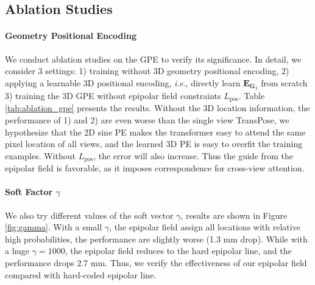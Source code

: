 \documentclass{bmvc2k}
\newcommand{\ie}{\textit{i}.\textit{e}., }
\begin{document}
\vspace{-0.5em}
\subsection{Ablation Studies}
\vspace{-0.5em}
\paragraph{Geometry Positional Encoding}
We conduct ablation studies on the GPE to verify its significance. In detail, we consider 3  settings: 1) training without 3D geometry positional encoding, 2) applying a learnable 3D positional encoding, \ie directly learn $\mathbf{E_G}_i$ from scratch 3) training the 3D GPE without epipolar field constraints $L_{\text{pos}}$. 
Table \ref{tab:ablation_gpe} presents the results. Without the 3D location information, the performance of 1) and 2) are even worse than the single view TransPose, we hypothesize that the 2D sine PE makes the transformer easy to attend the same pixel location of all views, and the learned 3D PE is easy to overfit the training examples. 
Without $L_{\text{pos}}$, the error will also increase. Thus the guide from the epipolar field is favorable, as it imposes correspondence for cross-view attention. 

\begin{table}[ht!]
\centering
{}
\vspace{-1 em}
\caption{\footnotesize{ Ablation studies on different types of 3D positional encoding } }
\label{tab:ablation_gpe}
\end{table}


\vspace{-1.0 em}
\paragraph{Soft Factor $\gamma$}
We also try different values of the soft vector $\gamma$, results are shown in Figure \ref{fig:gamma}. With a small $\gamma$, the epipolar field assign all locations with relative high probabilities, the performance are slightly worse (1.3 mm drop).  
While with a huge $\gamma=1000$, the epipolar field reduces to the hard epipolar line, and the performance drops $2.7$ mm. Thus, we verify the effectiveness of our epipolar field compared with hard-coded epipolar line. 
\end{document}
